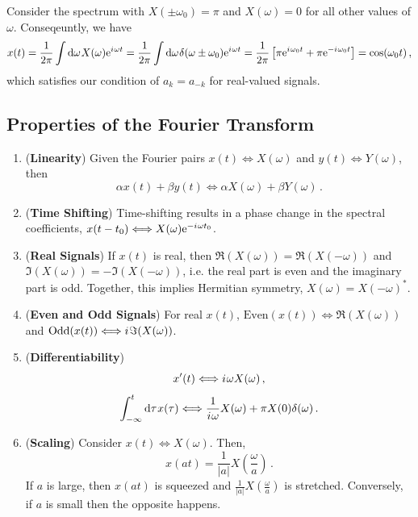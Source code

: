 \begin{exmp}
  Consider the spectrum with $X(\pm\omega_0) = \pi$ and $X(\omega) = 0$
  for all other values of $\omega$. Conseqeuntly, we have
  \begin{displaymath}
    x(t) = \frac{1}{2\pi}\int\mathrm{d}\omega\mkern1muX(\omega)\mathrm{e}^{{i\mkern1mu}\omega t}
    = \frac{1}{2\pi} \int\mathrm{d}\omega\mkern1mu\delta(\omega\pm\omega_0)\mathrm{e}^{{i\mkern1mu}\omega t}
    = \frac{1}{2\pi}\left[\pi\mathrm{e}^{{i\mkern1mu}\omega_0 t} + \pi\mathrm{e}^{-{i\mkern1mu}\omega_0 t}\right]
    = \cos(\omega_0 t) \,,
  \end{displaymath}
  which satisfies our condition of $a_k = a_{-k}$ for real-valued signals.
\end{exmp}

\subsection{Properties of the Fourier Transform}
%
\begin{enumerate}
\item (\textbf{Linearity}) Given the Fourier pairs $x(t) \Longleftrightarrow X(\omega)$ and
  $y(t) \Longleftrightarrow Y(\omega)$, then
  \begin{displaymath}
    \alpha x(t) + \beta y(t) \Longleftrightarrow \alpha X(\omega) + \beta Y(\omega) \,.
  \end{displaymath}
\item (\textbf{Time Shifting}) Time-shifting results in a phase change in the
  spectral coefficients, $x(t-t_0) \Longleftrightarrow X(\omega)\mathrm{e}^{-{i\mkern1mu}\omega t_0}$.
\item (\textbf{Real Signals}) If $x(t)$ is real, then $\Re(X(\omega)) = \Re(X(-\omega))$
  and $\Im(X(\omega)) = -\Im(X(-\omega))$, i.e. the real part is even and the imaginary
  part is odd. Together, this implies Hermitian symmetry, $X(\omega) = X(-\omega)^*$.
\item (\textbf{Even and Odd Signals}) For real $x(t)$,
  $\mathrm{Even}(x(t)) \Longleftrightarrow \Re(X(\omega))$ and
  $\mathrm{Odd}(x(t)) \Longleftrightarrow {i\mkern1mu}\Im(X(\omega))$.
\item (\textbf{Differentiability})
  \begin{displaymath}
    x^\prime(t) \Longleftrightarrow {i\mkern1mu}\omega X(\omega) \,,
  \end{displaymath}
  \begin{displaymath}
    \int_{-\infty}^t \mathrm{d}\tau\mkern1mux(\tau) \Longleftrightarrow \frac{1}{{i\mkern1mu}\omega}X(\omega) + \pi X(0)\delta(\omega) \,.
  \end{displaymath}
\item (\textbf{Scaling}) Consider $x(t) \Longleftrightarrow X(\omega)$. Then,
  \begin{displaymath}
    x(at) = \frac{1}{|a|} X\left(\frac{\omega}{a}\right) \,.
  \end{displaymath}
  If $a$ is large, then $x(at)$ is squeezed and $\frac{1}{|a|} X\left(\frac{\omega}{a}\right)$
  is stretched. Conversely, if $a$ is small then the opposite happens.
\end{enumerate}

